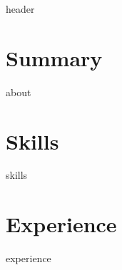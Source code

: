 \documentclass[letterpaper,11pt]{article}
\begin{document}
{header}\label{sec:header}

\vspace*{4pt}

\section{Summary}\label{sec:about}
\vspace*{4pt}
{about}
\vspace*{2pt}

\section{Skills}\label{sec:skills}
\vspace*{4pt}
{skills}
\vspace*{2pt}

\section{Experience}\label{sec:experience}
\vspace*{8pt}
{experience}
\end{document}
